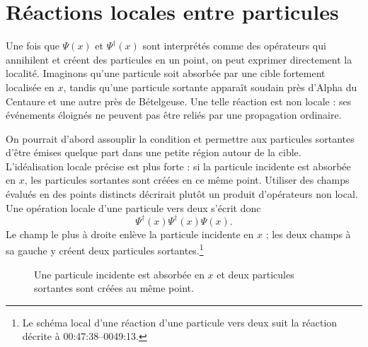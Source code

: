 \begin{classroomqa}
\end{classroomqa}

\section{Réactions locales entre particules}

Une fois que \(\Psi(x)\) et \(\Psi^\dagger(x)\) sont interprétés comme des opérateurs qui annihilent et créent des particules en un point, on peut exprimer directement la localité. Imaginons qu’une particule soit absorbée par une cible fortement localisée en \(x\), tandis qu’une particule sortante apparaît soudain près d’Alpha du Centaure et une autre près de Bételgeuse. Une telle réaction est non locale : ses événements éloignés ne peuvent pas être reliés par une propagation ordinaire.

On pourrait d’abord assouplir la condition et permettre aux particules sortantes d’être émises quelque part dans une petite région autour de la cible. L’idéalisation locale précise est plus forte : si la particule incidente est absorbée en \(x\), les particules sortantes sont créées en ce même point. Utiliser des champs évalués en des points distincts décrirait plutôt un produit d’opérateurs non local. Une opération locale d’une particule vers deux s’écrit donc
\begin{equation}
\Psi^\dagger(x)\Psi^\dagger(x)\Psi(x).
\end{equation}
Le champ le plus à droite enlève la particule incidente en \(x\) ; les deux champs à sa gauche y créent deux particules sortantes.\footnote{Le schéma local d’une réaction d’une particule vers deux suit la réaction décrite à 00:47:38--0049:13.}

\begin{figure}[t]\centering
{}\caption{Une particule incidente est absorbée en \(x\) et deux particules sortantes sont créées au même point.}\end{figure}

